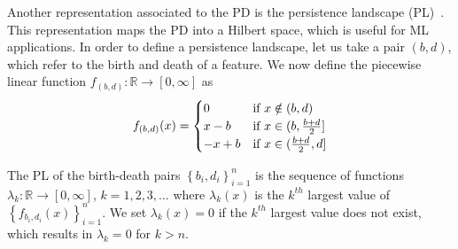 \documentclass{article}
\begin{document}
Another representation associated to the PD is the persistence landscape
(PL)~\citep{bubenik2015statistical, bubenik2020persistence}. This representation maps the PD into a
Hilbert space, which is useful for ML applications. In order to define a persistence landscape, let
us take a pair $(b,d)$, which refer to the birth and death of a feature. We now define the piecewise
linear function $f_{(b,d)}:\mathbb{R} \to [0, \infty]$ as
\begin{equation}
  \label{eq:piecewise_linear_landscape}
  f_{(b,d)}(x)=
  \begin{cases}
    0 & \text{if }x \notin (b,d)\\ x-b & \text{if }x\in (b,{b+d\over 2}]\\ -x+b & \text{if }x\in
      ({b+d\over 2},d]
  \end{cases}
\end{equation}


The PL of the birth-death pairs $\left\{b_i,d_i\right\}_{i=1}^{n}$ is the sequence of functions
$\lambda_k:\mathbb{R}\to [0,\infty]$, $k=1,2,3,\ldots$ where $\lambda_k(x)$ is the $k^{th}$ largest
value of $\left\{f_{b_i, d_i}(x)\right\}^{n}_{i=1}$. We set $\lambda_k(x)=0$ if the $k^{th}$ largest
value does not exist, which results in $\lambda_k=0$ for $k>n$.

\end{document}
